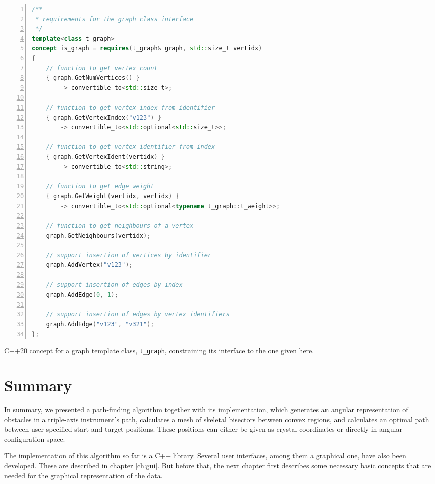 \begin{listing}[htb]
	\begin{lstlisting}[language = C++,
			basicstyle = {\scriptsize},
			breaklines = true, tabsize = 4,
			numbers = left, numberstyle={\scriptsize}]
/**
 * requirements for the graph class interface
 */
template<class t_graph>
concept is_graph = requires(t_graph& graph, std::size_t vertidx)
{
	// function to get vertex count
	{ graph.GetNumVertices() }
		-> convertible_to<std::size_t>;

	// function to get vertex index from identifier
	{ graph.GetVertexIndex("v123") }
		-> convertible_to<std::optional<std::size_t>>;

	// function to get vertex identifier from index
	{ graph.GetVertexIdent(vertidx) }
		-> convertible_to<std::string>;

	// function to get edge weight
	{ graph.GetWeight(vertidx, vertidx) }
		-> convertible_to<std::optional<typename t_graph::t_weight>>;

	// function to get neighbours of a vertex
	graph.GetNeighbours(vertidx);

	// support insertion of vertices by identifier
	graph.AddVertex("v123");

	// support insertion of edges by index
	graph.AddEdge(0, 1);

	// support insertion of edges by vertex identifiers
	graph.AddEdge("v123", "v321");
};
	\end{lstlisting}
	\caption[C++ graph template concept]{
	C++20 concept for a graph template class, \lstinline[language=C++]|t_graph|,
	constraining its interface to the one given here.
	\label{lst:graph_concept}}
\end{listing}



\section{Summary}
In summary, we presented a path-finding algorithm together with its implementation, which generates an angular 
representation of obstacles in a triple-axis instrument's path, calculates a mesh of skeletal bisectors between 
convex regions, and calculates an optimal path between user-specified start and target positions. These positions
can either be given as crystal coordinates or directly in angular configuration space.

The implementation of this algorithm so far is a C++ library. Several user interfaces, among them a 
graphical one, have also been developed. These are described in chapter \ref{ch:gui}.
But before that, the next chapter first describes some necessary basic concepts that are needed for the 
graphical representation of the data.


